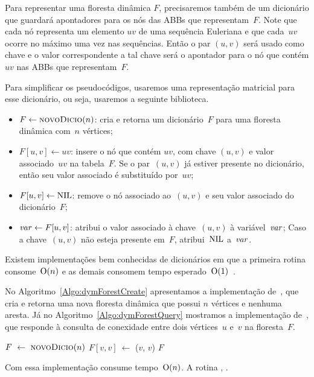 Para representar uma floresta dinâmica $F$, precisaremos também de um dicionário que guardará apontadores para os nós das ABBs que representam~$F$. Note que cada nó representa um elemento $uv$ de uma sequência Euleriana e que cada~$uv$ ocorre no máximo uma vez nas sequências. Então o par $(u,v)$ será usado como chave e o valor correspondente a tal chave será o apontador para o nó que contém $uv$ nas ABBs que representam~$F$.

Para simplificar os pseudocódigos, usaremos uma representação matricial para esse dicionário, ou seja, usaremos a seguinte biblioteca.
\begin{itemize}
    \item $F \gets \text{\scshape novoDicio}(n)$: cria e retorna um dicionário~$F$ para uma floresta dinâmica com~$n$ vértices;
    \item $F[u,v] \gets uv$: insere o nó que contém $uv$, com chave $(u,v)$ e valor associado~$uv$ na tabela~$F$.
    Se o par~$(u,v)$ já estiver presente no dicionário, então seu valor associado é substituído por~$uv$;
    \item $F[u,v] \gets \text{NIL}{}$: remove o nó associado ao~$(u,v)$ e seu valor associado do dicionário~$F$;
    \item $\mathit{var} \gets F[u,v]$: atribui o valor associado à chave~$(u,v)$ à variável~$\mathit{var}$; Caso a chave~$(u,v)$ não esteja presente em~$F$, atribui~$\text{NIL}$ a~$\mathit{var}$.
\end{itemize}
Existem implementações bem conhecidas de dicionários em que a primeira rotina consome~$\mathrm{O}(n)$ e as demais consomem tempo esperado~$\mathrm{O}(1)$~\cite{CLRS}.

No Algoritmo~\ref{Algo:dymForestCreate} apresentamos a implementação de~\dymForestCreate{}, que cria e retorna uma nova floresta dinâmica que possui $n$ vértices e nenhuma aresta.
Já no Algoritmo~\ref{Algo:dymForestQuery} mostramos a implementação de~\dymForestQuery{}, que responde à consulta de conexidade entre dois vértices~$u$ e~$v$ na floresta~$F$.


\begin{algorithm}[htb]
\caption{\dymForestCreate($n$)}
\label{Algo:dymForestCreate}
\begin{algorithmic}[1]
\State $F~\gets~\text{\scshape novoDicio}(n)$
\label{Algo:dymForestCreate:for}
\State $F[v,v]~\gets$ \treapCreate($v$, $v$)
\EndFor
\State \Return $F$
\end{algorithmic}
\end{algorithm}

Com essa implementação \dymForestCreate{} consume tempo~$\mathrm{O}(n)$. A rotina \dymForestQuery{}, .


